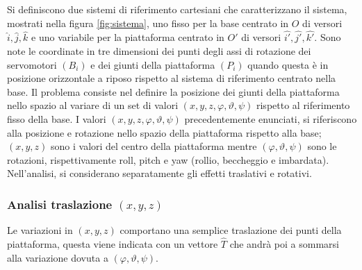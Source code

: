 \documentclass[12pt,twoside,openright]{report}
\begin{document}
Si definiscono due sistemi di riferimento cartesiani che caratterizzano il sistema, mostrati nella figura \ref{fig:sistema}, uno fisso per la base centrato in $O$ di versori $\hat{i},\hat{j},\hat{k}$ e uno variabile per la piattaforma centrato in $O'$ di versori $\hat{i'},\hat{j'},\hat{k'}$. Sono note le coordinate in tre dimensioni dei punti degli assi di rotazione dei servomotori $({B_i})$ e dei giunti della piattaforma $(P_i)$ quando questa è in posizione orizzontale a riposo rispetto al sistema di riferimento centrato nella base. Il problema consiste nel definire la posizione dei giunti della piattaforma nello spazio al variare di un set di valori $(x,y,z,\varphi,\vartheta,\psi)$ rispetto al riferimento fisso della base. I valori $(x,y,z,\varphi,\vartheta,\psi)$ precedentemente enunciati, si riferiscono alla posizione e rotazione nello spazio della piattaforma rispetto alla base; $(x,y,z)$ sono i valori del centro della piattaforma mentre $(\varphi,\vartheta,\psi)$ sono le rotazioni, rispettivamente roll, pitch e yaw (rollio, beccheggio e imbardata). Nell'analisi, si considerano separatamente gli effetti traslativi e rotativi.




\subsubsection{Analisi traslazione \boldmath$(x,y,z)$}\label{xyz}
Le variazioni in $(x,y,z)$ comportano una semplice traslazione dei punti della piattaforma, questa viene indicata con un vettore $\hat T$ che andrà poi a sommarsi alla variazione dovuta a $(\varphi,\vartheta,\psi)$.
\end{document}
